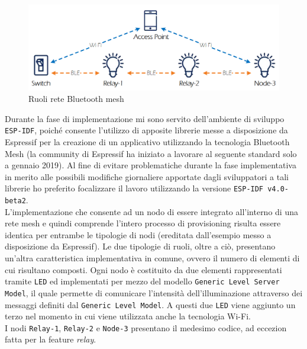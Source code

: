 \begin{figure}[!ht]
    \centering
    \includegraphics[width = \textwidth]{images/nodi_mesh.png}
    \caption{Ruoli rete Bluetooth mesh}
    \label{fig:ruoli_rete_mesh}
\end{figure}

\noindent Durante la fase di implementazione mi sono servito dell'ambiente di sviluppo \texttt{ESP-IDF}, poiché consente l'utilizzo di apposite librerie messe a disposizione da Espressif per la creazione di un applicativo utilizzando la tecnologia Bluetooth Mesh (la community di Espressif ha iniziato a lavorare al seguente standard solo a gennaio 2019). Al fine di evitare problematiche durante la fase implementativa in merito alle possibili modifiche giornaliere apportate dagli sviluppatori a tali librerie ho preferito focalizzare il lavoro utilizzando la versione \texttt{ESP-IDF v4.0-beta2}.\\ 

\noindent L'implementazione che consente ad un nodo di essere integrato all'interno di una rete mesh e quindi comprende l'intero processo di provisioning risulta essere identica per entrambe le tipologie di nodi (ereditata dall'esempio messo a disposizione da Espressif). Le due tipologie di ruoli, oltre a ciò, presentano un'altra caratteristica implementativa in comune, ovvero il numero di elementi di cui risultano composti. Ogni nodo è costituito da due elementi rappresentati tramite \texttt{LED} ed implementati per mezzo del modello \texttt{Generic Level Server Model}, il quale permette di comunicare l'intensità dell'illuminazione attraverso dei messaggi definiti dal \texttt{Generic Level Model}. A questi due \texttt{LED} viene aggiunto un terzo nel momento in cui viene utilizzata anche la tecnologia Wi-Fi.\\
I nodi \texttt{Relay-1}, \texttt{Relay-2} e \texttt{Node-3} presentano il medesimo codice, ad eccezion fatta per la feature \textit{relay}.\\

